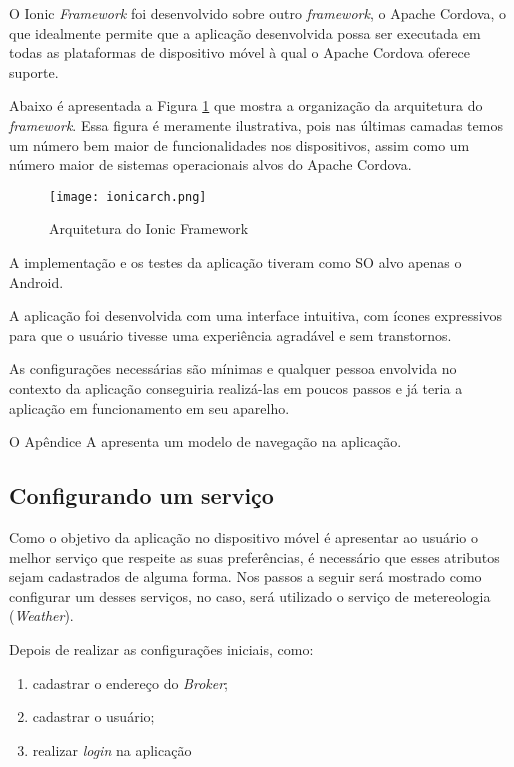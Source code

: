O Ionic \textit{Framework} foi desenvolvido sobre outro \textit{framework}, o Apache Cordova, o que idealmente permite que a aplicação desenvolvida possa ser executada em todas as plataformas de dispositivo móvel à qual o Apache Cordova oferece suporte.

Abaixo é apresentada a Figura \ref{fig:ionicarch} que mostra a organização da arquitetura do \textit{framework}. Essa figura é meramente ilustrativa, pois nas últimas camadas temos um número bem maior de funcionalidades nos dispositivos, assim como um número maior de sistemas operacionais alvos do Apache Cordova.

\begin{figure}[!htb]
  \centering
  \texttt{[image: ionicarch.png]} %
  \caption[Arquitetura do Ionic Framework]{Arquitetura do Ionic Framework}
  \label{fig:ionicarch}
\end{figure}

A implementação e os testes da aplicação tiveram como SO alvo apenas o Android.

A aplicação foi desenvolvida com uma interface intuitiva, com ícones expressivos para que o usuário tivesse uma experiência agradável e sem transtornos.

As configurações necessárias são mínimas e qualquer pessoa envolvida no contexto da aplicação conseguiria realizá-las em poucos passos e já teria a aplicação em funcionamento em seu aparelho.

O Apêndice A apresenta um modelo de navegação na aplicação.

\subsection{Configurando um serviço}
Como o objetivo da aplicação no dispositivo móvel é apresentar ao usuário o melhor serviço que respeite as suas preferências, é necessário que esses atributos sejam cadastrados de alguma forma. Nos passos a seguir será mostrado como configurar um desses serviços, no caso, será utilizado o serviço de metereologia (\textit{Weather}).

Depois de realizar as configurações iniciais, como:
\begin{footnotesize}
  \begin{enumerate}
    \item cadastrar o endereço do \textit{Broker};
    \item cadastrar o usuário;
    \item realizar \textit{login} na aplicação
  \end{enumerate}
\end{footnotesize}


